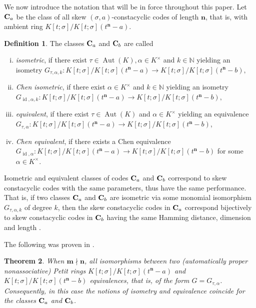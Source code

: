 \documentclass[11pt]{amsart}
\theoremstyle{plain}
\newtheorem{theorem}{Theorem}[section]
\theoremstyle{definition}
\newtheorem{definition}[theorem]{Definition}
\numberwithin{equation}{section}
\numberwithin{figure}{section}
\newcommand{\NN}{\mathbb{N}}
\DeclareMathOperator{\id}{id}
\newcommand{\os}{{\mathbf{m}}}  %
\newcommand{\de}{{\mathbf{n}}}  %
\DeclareMathOperator{\Aut}{Aut}
\begin{document}
We now introduce the notation that will be in force throughout this paper.  Let ${\bf C}_a$ be the class of all skew $(\sigma,a)$-constacyclic codes of length $\de$, that is, with ambient ring $K[t;\sigma]/K[t;\sigma](t^\de-a)$.

\begin{definition}\label{Definition:isometryChenisometryequivalenceChenequivalence}
The classes ${\bf C}_a$  and ${\bf C}_b$  are called
\begin{enumerate}[(i)]
\item  \emph{isometric}, if there exist $\tau \in \Aut(K), \alpha \in K^\times$ and $k\in \NN$ yielding an isometry
$G_{\tau,\alpha,k}:K[t;\sigma]/K[t;\sigma](t^\de-a)\rightarrow K[t;\sigma]/K[t;\sigma](t^\de-b),$
 \item \emph{Chen isometric}, if there exist $\alpha \in K^\times$ and $k\in \NN$ yielding an isometry
$G_{\id,\alpha,k}:K[t;\sigma]/K[t;\sigma](t^\de-a)\rightarrow K[t;\sigma]/K[t;\sigma](t^\de-b),$
\item  \emph{equivalent},  if there exist $\tau\in \Aut(K)$ and $\alpha\in K^\times$ yielding an equivalence
$G_{\tau,\alpha}:K[t;\sigma]/K[t;\sigma](t^\de-a)\rightarrow K[t;\sigma]/K[t;\sigma](t^\de-b)$,
\item \emph{Chen equivalent},  if there exists  a Chen equivalence
$G_{\id,\alpha}:K[t;\sigma]/K[t;\sigma](t^\de-a)\rightarrow K[t;\sigma]/K[t;\sigma](t^\de-b)$ for some $\alpha \in K^\times$.
\end{enumerate}
\end{definition}


Isometric and equivalent  classes of codes ${\bf C}_a$  and ${\bf C}_b$ correspond to skew constacyclic codes with the same
parameters, thus have the same performance.   That is, if two classes ${\bf C}_a$ and ${\bf C}_b$ are   isometric via some monomial isomorphism $G_{\tau,\alpha,k}$ of degree $k$, then the skew constacyclic  codes in ${\bf C}_a$ correspond bijectively to
  skew constacyclic codes in ${\bf C}_b$ having the same Hamming distance, dimension and length \cite{Pumpluen2025}.


The following was proven in \cite[Corollary 6.2]{NevinsPumpluen2025submitted}.


\begin{theorem}\label{T:isometryandequivalencecoincide}
    When  $\os \nmid \de$, all  isomorphisms between two (automatically proper nonassociative) Petit rings  $K[t;\sigma]/K[t;\sigma](t^\de-a)$ and $K[t;\sigma]/K[t;\sigma](t^\de-b)$  equivalences, that is, of the form $G=G_{\tau,\alpha}$.  Consequently, in this case the notions of isometry and equivalence coincide for the classes ${\bf C}_a$  and ${\bf C}_b$.
\end{theorem}
\end{document}
